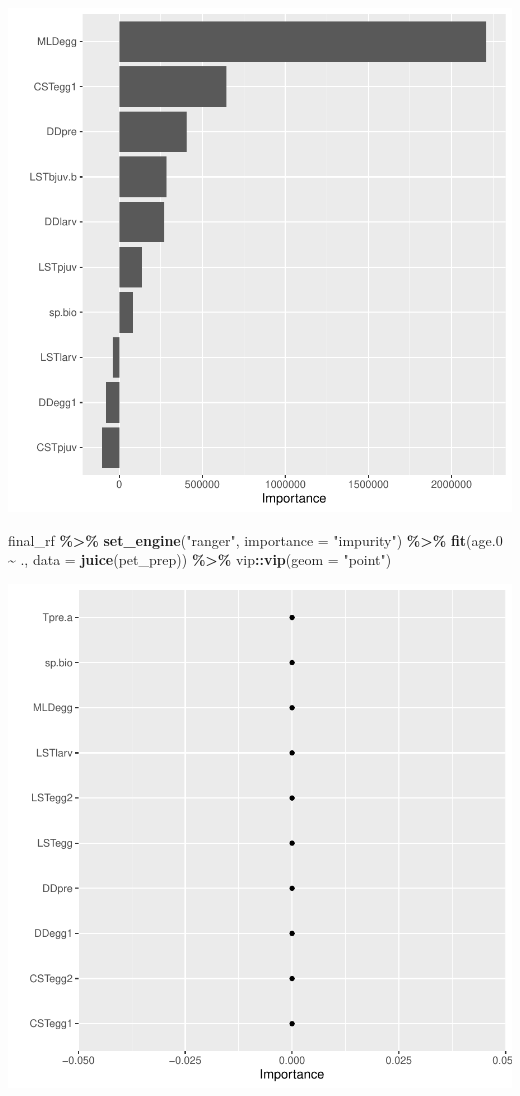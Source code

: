 \documentclass[
]{article}
\newenvironment{Shaded}{\begin{snugshade}}{\end{snugshade}}
\newcommand{\DataTypeTok}[1]{\textcolor[rgb]{0.13,0.29,0.53}{#1}}
\newcommand{\FloatTok}[1]{\textcolor[rgb]{0.00,0.00,0.81}{#1}}
\newcommand{\KeywordTok}[1]{\textcolor[rgb]{0.13,0.29,0.53}{\textbf{#1}}}
\newcommand{\NormalTok}[1]{#1}
\newcommand{\OperatorTok}[1]{\textcolor[rgb]{0.81,0.36,0.00}{\textbf{#1}}}
\newcommand{\StringTok}[1]{\textcolor[rgb]{0.31,0.60,0.02}{#1}}
\begin{document}
\includegraphics{calcurr_files/figure-latex/unnamed-chunk-14-2.pdf}

\begin{Shaded}
\begin{Highlighting}[]
\NormalTok{final\_rf }\OperatorTok{\%>\%}
\StringTok{  }\KeywordTok{set\_engine}\NormalTok{(}\StringTok{"ranger"}\NormalTok{, }\DataTypeTok{importance =} \StringTok{"impurity"}\NormalTok{) }\OperatorTok{\%>\%}
\StringTok{  }\KeywordTok{fit}\NormalTok{(age}\FloatTok{.0} \OperatorTok{\textasciitilde{}}\StringTok{ }\NormalTok{.,}
    \DataTypeTok{data =} \KeywordTok{juice}\NormalTok{(pet\_prep)) }\OperatorTok{\%>\%}
\StringTok{  }\NormalTok{vip}\OperatorTok{::}\KeywordTok{vip}\NormalTok{(}\DataTypeTok{geom =} \StringTok{"point"}\NormalTok{)}
\end{Highlighting}
\end{Shaded}

\includegraphics{calcurr_files/figure-latex/unnamed-chunk-14-3.pdf}
\end{document}
